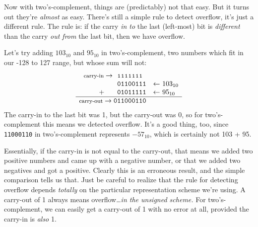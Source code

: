 Now with two's-complement, things are (predictably) not that easy. But it
turns out they're \textit{almost} as easy. There's still a simple rule to
detect overflow, it's just a different rule. The rule is: if the carry
\textit{in to} the last (left-most) bit is \textit{different} than the
carry \textit{out from} the last bit, then we have overflow.

Let's try adding $103_{10}$ and $95_{10}$ in two's-complement, two numbers
which fit in our -128 to 127 range, but whose sum will not:
\[
\begin{array}{*{9}{c@{\hspace{0pt}}}{l}}
\text{\footnotesize \text{carry-in}} \rightarrow & \texttt{{\footnotesize 1}} & \texttt{{\footnotesize 1}} & \texttt{{\footnotesize 1}}  & \texttt{{\footnotesize 1}} & \texttt{{\footnotesize 1}} & \texttt{{\footnotesize 1}} & \texttt{{\footnotesize 1}} & \\
  & \texttt{0} & \texttt{1} & \texttt{1} & \texttt{0} & \texttt{0} & \texttt{1} & \texttt{1} & \texttt{1} 
& \quad \textsl{$\leftarrow$ $103_{10}$}\\
\quad + & \texttt{0} & \texttt{1} & \texttt{0} & \texttt{1} & \texttt{1} & \texttt{1} & \texttt{1} & \texttt{1} 
& \quad \textsl{$\leftarrow$ $95_{10}$}\\
\hline
\text{\footnotesize \text{carry-out}} \rightarrow \texttt{0} & \texttt{1} & \texttt{1} & \texttt{0} & \texttt{0} & \texttt{0} & \texttt{1} & \texttt{1} & \texttt{0} \\
\end{array}
\]
The carry-in to the last bit was 1, but the carry-out was 0, so for
two's-complement this means we detected overflow. It's a good thing, too,
since \texttt{11000110} in two's-complement represents $-57_{10}$, which is
certainly not 103 + 95.

Essentially, if the carry-in is not equal to the carry-out, that means we
added two positive numbers and came up with a negative number, or that we
added two negatives and got a positive. Clearly this is an erroneous
result, and the simple comparison tells us that. Just be careful to realize
that the rule for detecting overflow depends \textit{totally} on the
particular representation scheme we're using. A carry-out of 1 always means
overflow\dots \textit{in the unsigned scheme.} For two's-complement, we can
easily get a carry-out of 1 with no error at all, provided the carry-in is
\textit{also} 1.

